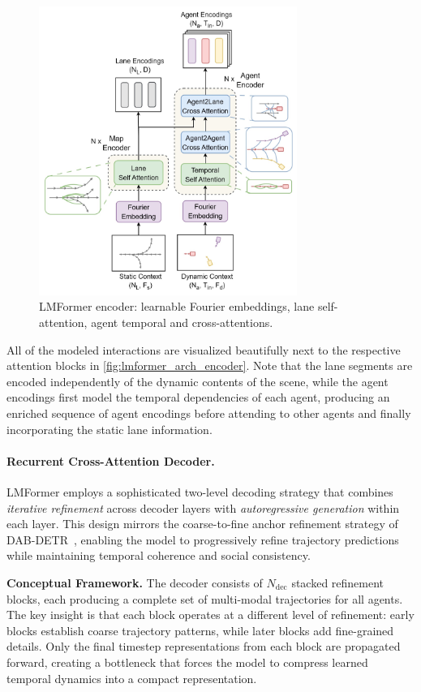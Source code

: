 \begin{figure}[ht]
  \centering
  \includegraphics[width=0.75\textwidth]{figures/lmformer_arch_encorder.png}
  \caption{LMFormer encoder: learnable Fourier embeddings, lane self-attention, agent temporal and cross-attentions.}
  \label{fig:lmformer_arch_encoder}
\end{figure}

All of the modeled interactions are visualized beautifully next to the respective attention blocks in \autoref{fig:lmformer_arch_encoder}. Note that the lane segments are encoded independently of the dynamic contents of the scene, while the agent encodings first model the temporal dependencies of each agent, producing an enriched sequence of agent encodings before attending to other agents and finally incorporating the static lane information.


\paragraph{Recurrent Cross-Attention Decoder.}
LMFormer employs a sophisticated two-level decoding strategy that combines \emph{iterative refinement} across decoder layers with \emph{autoregressive generation} within each layer. This design mirrors the coarse-to-fine anchor refinement strategy of DAB-DETR~\cite{liu2022dabdetr}, enabling the model to progressively refine trajectory predictions while maintaining temporal coherence and social consistency.

\textbf{Conceptual Framework.} The decoder consists of \(N_{\text{dec}}\) stacked refinement blocks, each producing a complete set of multi-modal trajectories for all agents. The key insight is that each block operates at a different level of refinement: early blocks establish coarse trajectory patterns, while later blocks add fine-grained details. Only the final timestep representations from each block are propagated forward, creating a bottleneck that forces the model to compress learned temporal dynamics into a compact representation.


